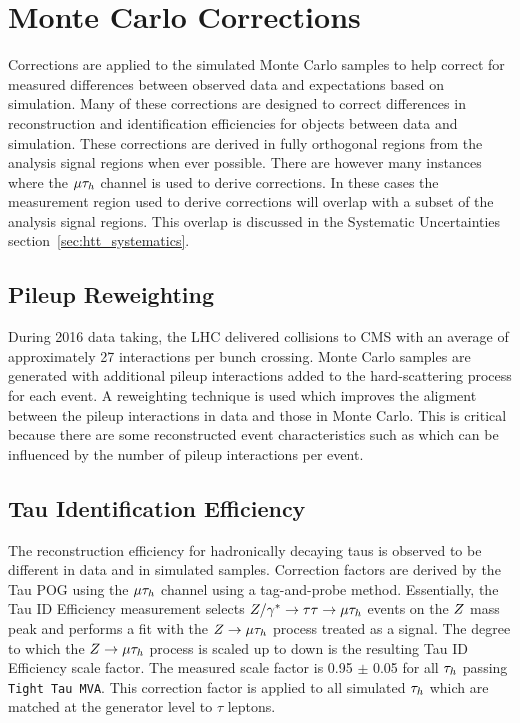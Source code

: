 \pagebreak

\section{Monte Carlo Corrections}
\label{sec:mc_corrections}

Corrections are applied to the simulated Monte Carlo samples to help correct for measured differences
between observed data and expectations based on simulation. Many of these corrections are designed
to correct differences in reconstruction and identification efficiencies for objects between data
and simulation. These corrections are derived in
fully orthogonal regions from the analysis signal regions when ever possible. There are however many
instances where the $\mu\tau_{h}$ channel is used to derive corrections. In these cases the measurement
region used to derive corrections will overlap with a subset of the analysis signal regions. This
overlap is discussed in the Systematic Uncertainties section~\ref{sec:htt_systematics}.


\subsection{Pileup Reweighting}
During 2016 data taking, the LHC delivered \pp collisions to CMS with an average of approximately 27
interactions per bunch crossing. Monte Carlo samples are generated with additional pileup interactions
added to the hard-scattering process for each event. A reweighting technique is used which improves
the aligment between the pileup interactions in data and those in Monte Carlo. This is critical because
there are some reconstructed event characteristics such as \etvecmiss which can be influenced by the
number of pileup interactions per event.


\subsection{Tau Identification Efficiency}
The reconstruction efficiency for hadronically decaying taus is observed to be different in data and in simulated samples.
Correction factors are derived by the Tau POG using the $\mu\tau_{h}$ channel using a tag-and-probe method. Essentially,
the Tau ID Efficiency measurement selects $Z/\gamma^*\to\tau\tau\to\mu\tau_{h}$ events on the $Z$
mass peak and performs a fit with the $Z\to\mu\tau_{h}$ process treated as a signal. The degree
to which the $Z\to\mu\tau_{h}$ process is scaled up to down is the resulting Tau ID Efficiency
scale factor. The measured scale factor is 0.95 $\pm$ 0.05 for all $\tau_{h}$ passing \texttt{Tight Tau MVA}.
This correction factor is applied to all simulated $\tau_{h}$ which are matched at the generator
level to $\tau$ leptons.


